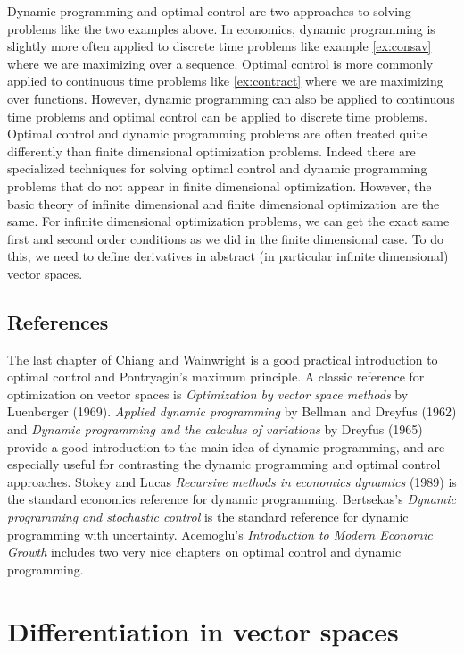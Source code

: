 \documentclass[12pt,reqno]{amsart}
\theoremstyle{definition}
\begin{document}
Dynamic programming and optimal control are two approaches to solving
problems like the two examples above. In economics, dynamic
programming is slightly more often applied to discrete time problems
like example \ref{ex:consav} where we are maximizing over a sequence. Optimal
control is more commonly applied to continuous time problems like
\ref{ex:contract} where we are maximizing over functions. However,
dynamic programming can also be applied to continuous time problems
and optimal control can be applied to discrete time problems. 
Optimal control and dynamic programming 
problems are often treated quite differently than finite dimensional
optimization problems. Indeed there are specialized techniques for
solving optimal control and dynamic programming problems that do not
appear in finite dimensional optimization. However, the basic theory
of infinite dimensional and finite dimensional optimization are the
same. 
For infinite dimensional optimization problems, we can get the exact
same first and second order conditions as we did in the finite
dimensional case. To do this, we need to define derivatives in
abstract (in particular infinite dimensional) vector spaces. 

\subsection{References}
The last chapter of Chiang and Wainwright is a good practical
introduction to optimal control and Pontryagin's maximum principle.  A
classic reference for optimization on vector spaces is
\textit{Optimization by vector space methods} by Luenberger
(1969). \textit{Applied dynamic programming} by Bellman and Dreyfus
(1962) and \textit{Dynamic programming and the calculus of variations}
by Dreyfus (1965) provide a good introduction to the main idea of
dynamic programming, and are especially useful for contrasting the
dynamic programming and optimal control approaches. Stokey and Lucas
\textit{Recursive methods in economics dynamics} (1989) is the
standard economics reference for dynamic programming. Bertsekas's
\textit{Dynamic programming and stochastic control} is the standard
reference for dynamic programming with uncertainty. Acemoglu's
\textit{Introduction to Modern Economic Growth} includes two very nice
chapters on optimal control and dynamic programming.


\section{Differentiation in vector spaces}
\end{document}
